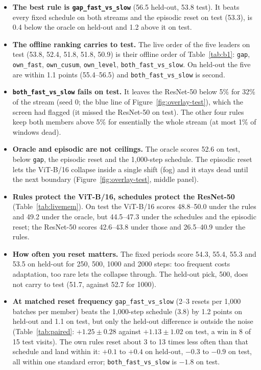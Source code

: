 \documentclass[10pt]{article}
\newcommand{\rl}[1]{\texttt{#1}}
\newcommand{\vit}{ViT-B/16}
\newcommand{\rn}{ResNet-50}
\begin{document}
\begin{itemize}
  \item \textbf{The best rule is \rl{gap\_fast\_vs\_slow}} (56.5 held-out, 53.8 test). It beats every fixed schedule on both streams and the episodic reset on test (53.3), is 0.4 below the oracle on held-out and 1.2 above it on test.
  \item \textbf{The offline ranking carries to test.} The live order of the five leaders on test (53.8, 52.4, 51.8, 51.8, 50.9) is their offline order of Table~\ref{tab:b1}: \rl{gap}, \rl{own\_fast}, \rl{own\_cusum}, \rl{own\_level}, \rl{both\_fast\_vs\_slow}. On held-out the five are within 1.1 points (55.4--56.5) and \rl{both\_fast\_vs\_slow} is second.
  \item \textbf{\rl{both\_fast\_vs\_slow} fails on test.} It leaves the \rn{} below 5\% for 32\% of the stream (seed 0; the blue line of Figure~\ref{fig:overlay-test}), which the screen had flagged (it missed the \rn{} on test). The other four rules keep both members above 5\% for essentially the whole stream (at most 1\% of windows dead).
  \item \textbf{Oracle and episodic are not ceilings.} The oracle scores 52.6 on test, below \rl{gap}, the episodic reset and the 1,000-step schedule. The episodic reset lets the \vit{} collapse inside a single shift (fog) and it stays dead until the next boundary (Figure~\ref{fig:overlay-test}, middle panel).
  \item \textbf{Rules protect the \vit{}, schedules protect the \rn{}} (Table~\ref{tab:livemem}). On test the \vit{} scores 48.8--50.0 under the rules and 49.2 under the oracle, but 44.5--47.3 under the schedules and the episodic reset; the \rn{} scores 42.6--43.8 under those and 26.5--40.9 under the rules.
  \item \textbf{How often you reset matters.} The fixed periods score 54.3, 55.4, 55.3 and 53.5 on held-out for 250, 500, 1000 and 2000 steps: too frequent costs adaptation, too rare lets the collapse through. The held-out pick, 500, does not carry to test (51.7, against 52.7 for 1000).
  \item \textbf{At matched reset frequency} \rl{gap\_fast\_vs\_slow} (2--3 resets per 1,000 batches per member) beats the 1,000-step schedule (3.8) by 1.2 points on held-out and 1.1 on test, but only the held-out difference is outside the noise (Table~\ref{tab:paired}: $+1.25 \pm 0.28$ against $+1.13 \pm 1.02$ on test, a win in 8 of 15 test visits). The own rules reset about 3 to 13 times less often than that schedule and land within it: $+0.1$ to $+0.4$ on held-out, $-0.3$ to $-0.9$ on test, all within one standard error; \rl{both\_fast\_vs\_slow} is $-1.8$ on test.

\end{itemize}
\end{document}
